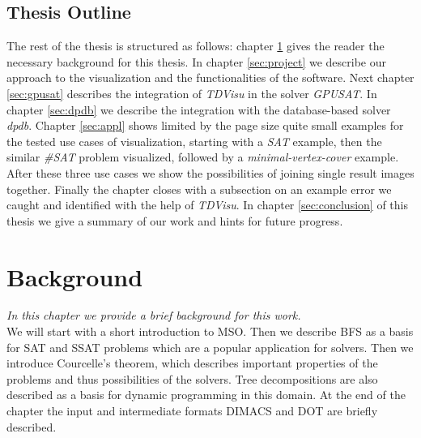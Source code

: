 \documentclass[a4paper, 12pt, bibliography=totoc]{scrartcl}
\begin{document}
\subsection{Thesis Outline}

The rest of the thesis is structured as follows: chapter \ref{sec:bg} gives the reader the necessary background for this thesis. In chapter \ref{sec:project} we describe our approach to the visualization and the functionalities of the software. Next chapter \ref{sec:gpusat} describes the integration of \textit{TDVisu} in the solver \textit{GPUSAT}. In chapter \ref{sec:dpdb} we describe the integration with the database-based solver \textit{dpdb}.
Chapter \ref{sec:appl} shows limited by the page size quite small examples for the tested use cases of visualization, starting with a \textit{SAT} example, then the similar \textit{\#SAT} problem visualized, followed by a \textit{minimal-vertex-cover} example. After these three use cases we show the possibilities of joining single result images together. Finally the chapter closes with a subsection on an example error we caught and identified with the help of \textit{TDVisu}. In chapter \ref{sec:conclusion} of this thesis we give a summary of our work and hints for future progress.

\newpage
\section{Background}\label{sec:bg}
\textit{In this chapter we provide a brief background for this work.}\\


We will start with a short introduction to MSO. Then we describe BFS as a basis for SAT and SSAT problems which are a popular application for solvers.
Then we introduce Courcelle's theorem, which describes important properties of the problems and thus possibilities of the solvers.
Tree decompositions are also described as a basis for dynamic programming in this domain.
At the end of the chapter the input and intermediate formats DIMACS and DOT are briefly described.
\end{document}
